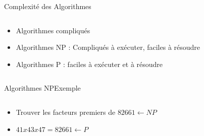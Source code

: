 \documentclass{beamer}
\begin{document}
\begin{frame}{Complexit\'e des Algorithmes}
  \begin{columns}
    \begin{column}{0.5\textwidth}
      \begin{itemize}
      \item Algorithmes compliqu\'es
        \color{red}
      \item Algorithmes NP : Compliqu\'es \`a ex\'ecuter, faciles \`a r\'esoudre
        \color{blue}
      \item Algorithmes P : faciles \`a ex\'ecuter et \`a r\'esoudre
      \end{itemize}
    \end{column}
  
    \begin{column}{0.5\textwidth}
    \end{column}
  \end{columns}
\end{frame}

\begin{frame}{Algorithmes NP}{Exemple}
  \begin{columns}
    \begin{column}{0.5\textwidth}
      \begin{itemize}
      \item Trouver les facteurs premiers de $82661 \leftarrow NP$
      \item $41x43x47 = 82661 \leftarrow P$
      \end{itemize}
    \end{column}
    
    \begin{column}{0.5\textwidth}
    \end{column}
  \end{columns}
\end{frame}
\end{document}
